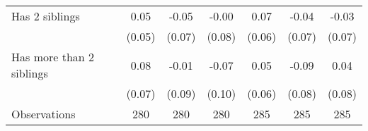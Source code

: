 {\begin{tabular}{l*{6}{c}}
\addlinespace
Has 2 siblings      &        0.05         &       -0.05         &       -0.00         &        0.07         &       -0.04         &       -0.03         \\
                    &      (0.05)         &      (0.07)         &      (0.08)         &      (0.06)         &      (0.07)         &      (0.07)         \\
\addlinespace
Has more than 2 siblings&        0.08         &       -0.01         &       -0.07         &        0.05         &       -0.09         &        0.04         \\
                    &      (0.07)         &      (0.09)         &      (0.10)         &      (0.06)         &      (0.08)         &      (0.08)         \\
\midrule
Observations        &         280         &         280         &         280         &         285         &         285         &         285         \\
\bottomrule
\end{tabular}
}